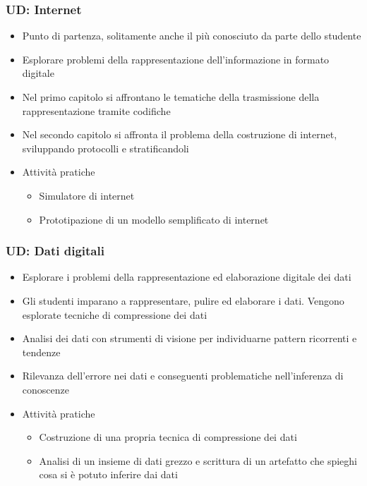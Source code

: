 \documentclass[
    hyperref={colorlinks,citecolor=black,linkcolor=black,urlcolor=blue}
]{beamer}
\begin{document}
\begin{frame}
  \frametitle{UD: Internet}

  \begin{itemize}
    \item Punto di partenza, solitamente anche il più conosciuto da parte dello studente
    \item Esplorare problemi della rappresentazione dell'informazione in formato digitale
    \item Nel primo capitolo si affrontano le tematiche della trasmissione della rappresentazione tramite codifiche
    \item Nel secondo capitolo si affronta il problema della costruzione di internet, sviluppando protocolli e stratificandoli
    \item Attività pratiche
    \begin{itemize}
      \item Simulatore di internet
      \item Prototipazione di un modello semplificato di internet
    \end{itemize}
  \end{itemize}
\end{frame}

\begin{frame}
  \frametitle{UD: Dati digitali}

  \begin{itemize}
    \item Esplorare i problemi della rappresentazione ed elaborazione digitale dei dati
    \item Gli studenti imparano a rappresentare, pulire ed elaborare i dati. Vengono esplorate tecniche di compressione dei dati
    \item Analisi dei dati con strumenti di visione per individuarne pattern ricorrenti e tendenze
    \item Rilevanza dell'errore nei dati e conseguenti problematiche nell'inferenza di conoscenze
    \item Attività pratiche
    \begin{itemize}
      \item Costruzione di una propria tecnica di compressione dei dati
      \item Analisi di un insieme di dati grezzo e scrittura di un artefatto che spieghi cosa si è potuto inferire dai dati
    \end{itemize}
  \end{itemize}
\end{frame}
\end{document}

